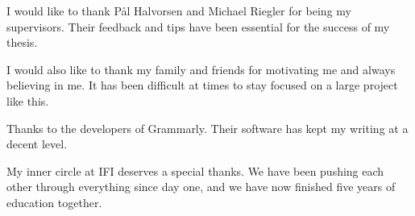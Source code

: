 I would like to thank Pål Halvorsen and Michael Riegler for being my supervisors. Their feedback and tips have been essential for the success of my thesis.

I would also like to thank my family and friends for motivating me and always believing in me. It has been difficult at times to stay focused on a large project like this.

Thanks to the developers of Grammarly. Their software has kept my writing at a decent level.

My inner circle at IFI deserves a special thanks. We have been pushing each other through everything since day one, and we have now finished five years of education together.